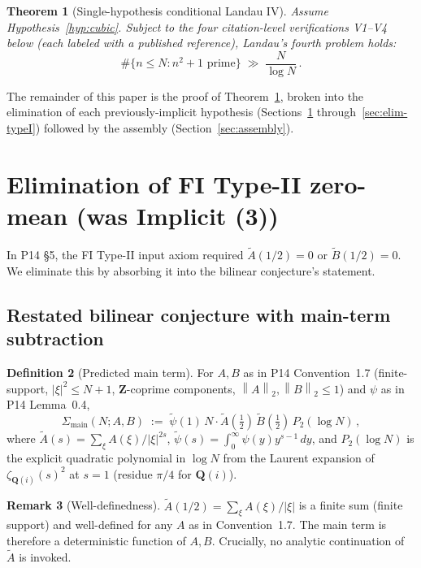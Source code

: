 \documentclass[11pt]{article}
\newtheorem{theorem}{Theorem}[section]
\theoremstyle{definition}
\newtheorem{definition}[theorem]{Definition}
\newtheorem{remark}[theorem]{Remark}
\newcommand{\Z}{\mathbf{Z}}
\newcommand{\Q}{\mathbf{Q}}
\newcommand{\Qi}{\Q(i)}
\newcommand{\norm}[1]{\left\lVert #1\right\rVert}
\begin{document}
\begin{theorem}[Single-hypothesis conditional Landau IV]\label{thm:landau-final}
Assume Hypothesis~\ref{hyp:cubic}. Subject to the four citation-level verifications V1--V4 below (each labeled with a published reference), Landau's fourth problem holds:
\[
   \#\{n\le N:n^2+1\text{ prime}\}\;\gg\;\frac{N}{\log N}\,.
\]
\end{theorem}

The remainder of this paper is the proof of Theorem~\ref{thm:landau-final}, broken into the elimination of each previously-implicit hypothesis (Sections~\ref{sec:elim-3} through~\ref{sec:elim-typeI}) followed by the assembly (Section~\ref{sec:assembly}).

\section{Elimination of FI Type-II zero-mean (was Implicit (3))}\label{sec:elim-3}

In P14 §5, the FI Type-II input axiom required $\widetilde A(1/2)=0$ or $\widetilde B(1/2)=0$. We eliminate this by absorbing it into the bilinear conjecture's statement.

\subsection{Restated bilinear conjecture with main-term subtraction}\label{ssec:restated-conj}

\begin{definition}[Predicted main term]\label{def:Sigma-main}
For $A,B$ as in P14 Convention~1.7 (finite-support, $|\xi|^2\le N+1$, $\Z$-coprime components, $\norm{A}_2,\norm{B}_2\le 1$) and $\psi$ as in P14 Lemma~0.4,
\[
   \Sigma_{\mathrm{main}}(N;A,B)\;:=\;\widetilde\psi(1)\,N\cdot\widetilde A(\tfrac12)\,\widetilde B(\tfrac12)\,P_2(\log N)\,,
\]
where $\widetilde A(s)=\sum_\xi A(\xi)/|\xi|^{2s}$, $\widetilde\psi(s)=\int_0^\infty\psi(y)y^{s-1}\,dy$, and $P_2(\log N)$ is the explicit quadratic polynomial in $\log N$ from the Laurent expansion of $\zeta_{\Qi}(s)^2$ at $s=1$ (residue $\pi/4$ for $\Qi$).
\end{definition}

\begin{remark}[Well-definedness]\label{rem:main-well-def}
$\widetilde A(1/2)=\sum_\xi A(\xi)/|\xi|$ is a finite sum (finite support) and well-defined for any $A$ as in Convention~1.7. The main term is therefore a deterministic function of $A,B$. Crucially, no analytic continuation of $\widetilde A$ is invoked.
\end{remark}
\end{document}
